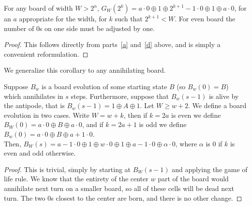 \documentclass[12pt,letterpaper]{article}
\begin{document}
\begin{cor}\label{SingleWallPairPow2}
  For any board of width $W>2^n$, $G_W(2^k)=a\cdot 0\oplus 1\oplus 2^{k+1}-1\cdot 0\oplus 1\oplus a\cdot 0$, for an $a$ appropriate for the width, for $k$ such that $2^{k+1}<W$. For even board the number of 0s on one side must be adjusted by one.
\end{cor}
\begin{proof}
  This follows directly from parts~\ref{a} and~\ref{d} above, and is simply a convenient reformulation.
\end{proof}

We generalize this corollary to any annihilating board.
\begin{prop}\label{PostAnnihilation}
  Suppose $B_w$ is a board evolution of some starting state $B$ (so $B_w(0)=B$) which annihilates in $s$ steps. Furthermore, suppose that $B_w(s-1)$ is alive by the antipode, that is $B_w(s-1)=1\oplus A\oplus 1$. Let $W\geq w+2$. We define a board evolution in two cases. Write $W=w+k$, then if $k=2a$ is even we define $B_W(0)=a\cdot 0 \oplus B\oplus a\cdot 0$, and if $k=2a+1$ is odd we define $B_w(0)=a\cdot 0\oplus B\oplus a+1\cdot 0$. \\
  Then, $B_W(s)=a-1\cdot 0\oplus 1\oplus w\cdot 0\oplus 1\oplus a-1\cdot 0\oplus \alpha\cdot 0$, where $\alpha$ is 0 if $k$ is even and odd otherwise.
\end{prop}
\begin{proof}
  This is trivial, simply by starting at $B_W(s-1)$ and applying the game of life rule. We know that the entirety of the center $w$ part of the board would annihilate next turn on a smaller board, so all of these cells will be dead next turn. The two 0s closest to the center are born, and there is no other change.
\end{proof}
\end{document}
